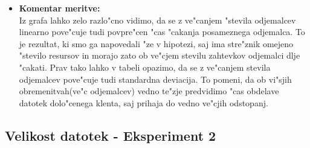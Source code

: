 \begin{itemize}
	\item \textbf{Komentar meritve: } \\ 
		Iz grafa lahko zelo razlo"cno vidimo, da se z ve"canjem "stevila odjemalcev linearno pove"cuje tudi povpre"cen "cas "cakanja posameznega odjemalca. To je rezultat, ki smo ga napovedali "ze v hipotezi, saj ima stre"znik omejeno "stevilo resursov in morajo zato ob ve"cjem stevilu zahtevkov odjemalci dlje "cakati. Prav tako lahko v tabeli opazimo, da se z ve"canjem stevila odjemalcev pove"cuje tudi standardna deviacija. To pomeni, da ob vi"sjih obremenitvah(ve"c odjemalcev) vedno te"zje predvidimo "cas obdelave datotek dolo"cenega klenta, saj prihaja do vedno ve"cjih odstopanj. 


\end{itemize}


\subsection{Velikost datotek - Eksperiment 2}
